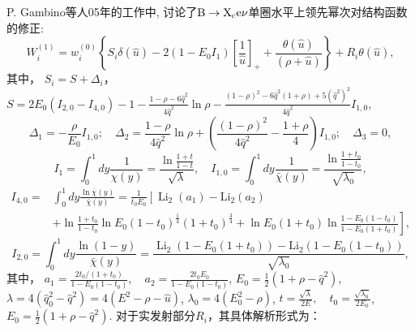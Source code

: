 P. Gambino等人05年的工作中, 讨论了$\mathrm{B\to X_{\text{c}}e\nu}$单圈水平上领先幂次对结构函数的修正:
\begin{equation}
    W_i^{(1)}=w_i^{(0)}\left\{S_i \delta(\hat{u})-2\left(1-E_0 I_1\right)\left[\frac{1}{\hat{u}}\right]_{+}+\frac{\theta(\hat{u})}{(\rho+\hat{u})}\right\}+R_i \theta(\hat{u}),
    \end{equation}
其中， $S_i=S+\Delta_i$，
$S=2 E_0\left(I_{2,0}-I_{4,0}\right)-1-\frac{1-\rho-6 \hat{q}^2}{4 \hat{q}^2} \ln \rho-\frac{(1-\rho)^2-6 \hat{q}^2(1+\rho)+5\left(\hat{q}^2\right)^2}{4 \hat{q}^2} I_{1,0},$
$$\Delta_1=-\frac{\rho}{E_0} I_{1,0} ; \quad \Delta_2=\frac{1-\rho}{4 \hat{q}^2} \ln \rho+\left(\frac{(1-\rho)^2}{4 \hat{q}^2}-\frac{1+\rho}{4}\right) I_{1,0} ; \quad \Delta_3=0,$$
$$
I_1=\int_0^1 d y \frac{1}{\chi(y)}=\frac{\ln \frac{1+t}{1-t}}{\sqrt{\lambda}}, \quad I_{1,0}=\int_0^1 d y \frac{1}{\bar{\chi}(y)}=\frac{\ln \frac{1+t_0}{1-t_0}}{\sqrt{\lambda_0}},
$$
$$
\begin{aligned}
I_{4,0}= & \int_0^1 d y \frac{\ln \bar{\chi}(y)}{\bar{\chi}(y)}=\frac{1}{t_0 E_0}\left[\operatorname{Li}_2\left(a_1\right)-\mathrm{Li}_2\left(a_2\right)\right. \\
& \left.+\ln \frac{1+t_0}{1-t_0} \ln E_0\left(1-t_0\right)^{\frac{1}{4}}\left(1+t_0\right)^{\frac{3}{4}}+\ln E_0\left(1+t_0\right) \ln \frac{1-E_0\left(1-t_0\right)}{1-E_0\left(1+t_0\right)}\right],
\end{aligned}
$$
$$
I_{2,0}=\int_0^1 d y \frac{\ln (1-y)}{\bar{\chi}(y)}=\frac{\operatorname{Li}_2\left(1-E_0\left(1+t_0\right)\right)-\mathrm{Li}_2\left(1-E_0\left(1-t_0\right)\right)}{\sqrt{\lambda_0}},
$$
其中， $a_1=\frac{2 t_0 /\left(1+t_0\right)}{1-E_0\left(1-t_0\right)}, \quad a_2=\frac{2 t_0 E_0}{1-E_0\left(1-t_0\right)}$, $E_0=\frac{1}{2}\left(1+\rho-\hat{q}^2\right)$, $\lambda=4\left(\hat{q}_0^2-\hat{q}^2\right)=4\left(E^2-\rho-\hat{u}\right)$, $\lambda_0=4\left(E_0^2-\rho\right)$, $t=\frac{\sqrt{\lambda}}{2 E}, \quad t_0=\frac{\sqrt{\lambda_0}}{2 E_0}$, $E_0=\frac{1}{2}\left(1+\rho-\hat{q}^2\right)$.
对于实发射部分$R_{i}$，其具体解析形式为：
